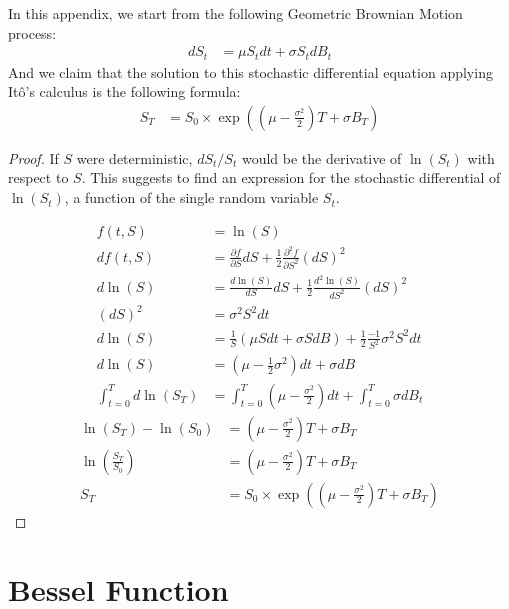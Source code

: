 \documentclass[12pt,oneside]{reedthesis}
\theoremstyle{definition}
\theoremstyle{definition}
\theoremstyle{remark}
\begin{document}
  In this appendix, we start from the following Geometric Brownian Motion
  process:
  \begin{align*}
  dS_t &= \mu S_t dt + \sigma S_t dB_t
  \end{align*}
  And we claim that the solution to this stochastic differential equation
  applying Itô's calculus is the following formula:
  \begin{align*}
  S_T &= S_0 \times \exp \left( \left( \mu  - \frac{\sigma^2}{2} \right) T  + \sigma B_T \right)
  \end{align*}
  \begin{proof}
  
  If $S$ were deterministic, $dS_t/S_t$ would be the derivative of $\ln(S_t)$ with respect to $S$. This suggests to find an expression for the stochastic differential of $\ln(S_t)$, a function of the single random variable $S_t$.
  
  
  \begin{align*} 
  f(t,S) &= \ln(S) \\[10pt]
  df(t,S) &= \frac{\partial f}{\partial S} dS + \frac{1}{2} \frac{\partial^2 f}{\partial S^2} (dS)^2 \\[10pt]
  d\ln(S) &= \frac{d\ln(S)}{dS} dS + \frac{1}{2} \frac{d^2\ln(S)}{dS^2}(dS)^2 \\[10pt]
  (dS)^2 &= \sigma^2 S^2 dt \\[10pt]
  d\ln(S) &= \frac{1}{S} (\mu S dt + \sigma S dB) + \frac{1}{2}\frac{-1}{S^2} \sigma^2 S^2 dt \\[10pt]
  d\ln(S) &= \left( \mu -  \frac{1}{2} \sigma^2 \right) dt + \sigma dB \\[10pt]
  \int_{t=0}^{T}{d\ln(S_T)} &= \int_{t=0}^{T}{\left( \mu - \frac{\sigma^2}{2} \right) dt} + \int_{t=0}^{T}{\sigma dB_t} 
  \end{align*}
  \begin{align*} 
  \ln(S_T) - \ln(S_0) &=  \left(\mu  - \frac{\sigma^2}{2} \right)  T + \sigma B_T \\[10pt]
  \ln \left( \frac{S_T}{S_0} \right) &= \left( \mu  - \frac{\sigma^2}{2}  \right) T + \sigma B_T \\[10pt]
  S_T &= S_0 \times \exp \left( \left( \mu  - \frac{\sigma^2}{2} \right) T  + \sigma B_T \right) 
  \end{align*}
  \end{proof}
  \chapter{Bessel Function}\label{bessel}
  
\end{document}
